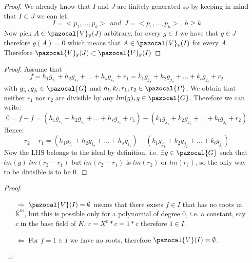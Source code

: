 \documentclass[11pt,a4paper]{report}
\theoremstyle{plain}
\theoremstyle{definition}
\newcommand{\Po}{\pazocal{P}}
\newcommand{\V}{\pazocal{V}}
\begin{document}
\begin{thm-hand}[2.1.17]
\end{thm-hand}
\begin{proof}
	We already know that $I$ and $J$ are finitely generated so by keeping in mind that $I \subset J$ we can let:
	\[
		I = <p_1,\ldots,p_k>\ \ and\ \ J = <p_1,\ldots,p_h>,\ h\ge k	
	\]
	Now pick $A \in \pazocal{V}_\mathbb{F}(J)$ arbitrary, for every $g \in I$ we have that $g \in J$ therefore $g(A) = 0$ which means that $A \in \pazocal{V}_\mathbb{F}(I)$ for every $A$. Therefore $\pazocal{V}_\mathbb{F}(J) \subset \pazocal{V}_\mathbb{F}(I)$
\end{proof}

\begin{prop-hand}[2.2.6]
\end{prop-hand}
\begin{proof}
	Assume that 
	\[
		f = h_1g_{i_1} + h_2g_{i_2} + \ldots + h_sg_{i_s} + r_1 = k_1g_{j_1} + k_2g_{j_2} + \ldots + k_tg_{j_t} + r_2
	\]
	with $g_{i_l}, g_{j_l} \in \pazocal{G}$ and $h_l,k_l,r_1,r_2 \in \Po$. We obtain that neither $r_1$ nor $r_2$ are divisible by any $lm(g), g\in \pazocal{G}$. Therefore we can write:
	\[
		0 = f - f = (h_1g_{i_1} + h_2g_{i_2} + \ldots + h_sg_{i_s} + r_1) - (k_1g_{j_1} + k_2g_{j_2} + \ldots + k_tg_{j_t} + r_2)
	\]
	Hence:
	\[
		r_2 - r_1 = 	(h_1g_{i_1} + h_2g_{i_2} + \ldots + h_sg_{i_s}) - (k_1g_{j_1} + k_2g_{j_2} + \ldots + k_tg_{j_t})
	\]
	Now the LHS belongs to the ideal by definition, i.e. $\exists g \in  \pazocal{G}$ such that $lm(g) | lm(r_2 - r_1)$ but $lm(r_2 - r_1)$ is $lm(r_2)$ or $lm(r_1)$, so the only way to be divisible is to be 0.
\end{proof}

\begin{cor-hand}[2.2.9]
\end{cor-hand}
\begin{proof}
\begin{itemize}
	\item[$\Rightarrow$] $\V(I) = \emptyset$ means that there exists $f \in I$ that has no roots in $\overline{\mathbb{K}}^m$, but this is possible only for a polynomial of degree $0$, i.e. a constant, say $c$ in the base field of $K$. $c = X^0 * c = 1*c$ therefore $1 \in I$.
	\item[$\Leftarrow$] For $f = 1 \in I$ we have no roots, therefore $\V(I) = \emptyset$.
\end{itemize}
\end{proof}
\end{document}
